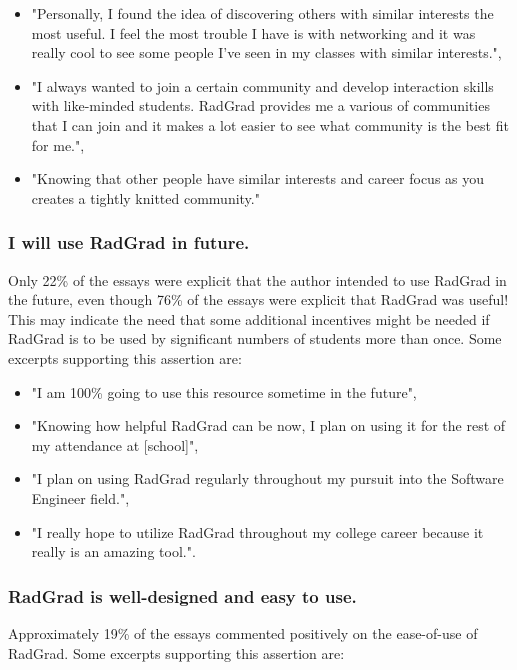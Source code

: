 \documentclass[acmsmall,nonacm]{acmart}
\begin{document}
\begin{itemize}[leftmargin=*]
\item "Personally, I found the idea of discovering others with similar interests the most useful. I feel the most trouble I have is with networking and it was really cool to see some people I've seen in my classes with similar interests.",
\item "I always wanted to join a certain community and develop interaction skills with like-minded students. RadGrad provides me a various of communities that I can join and it makes a lot easier to see what community is the best fit for me.",
\item "Knowing that other people have similar interests and career focus as you creates a tightly knitted community."
\end{itemize}

\subsubsection{I will use RadGrad in future.}  Only 22\% of the essays were explicit that the author intended to use RadGrad in the future, even though 76\% of the essays were explicit that RadGrad was useful!  This may indicate the need that some additional incentives might be needed if RadGrad is to be used by significant numbers of students more than once. Some excerpts supporting this assertion are:

\begin{itemize}[leftmargin=*]
\item "I am 100\% going to use this resource sometime in the future",
\item "Knowing how helpful RadGrad can be now, I plan on using it for the rest of my attendance at [school]",
\item "I plan on using RadGrad regularly throughout my pursuit into the Software Engineer field.",
\item "I really hope to utilize RadGrad throughout my college career because it really is an amazing tool.".
\end{itemize}

\subsubsection{RadGrad is well-designed and easy to use.}  Approximately 19\% of the essays commented positively on the ease-of-use of RadGrad.
Some excerpts supporting this assertion are:
\end{document}
